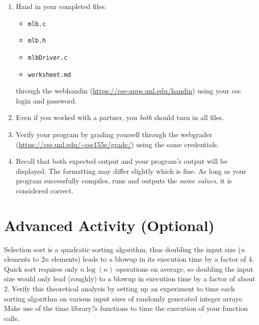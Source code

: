 \documentclass[12pt]{scrartcl}
\begin{document}
\begin{enumerate}
  \item Hand in your completed files:
  \begin{itemize}
    \item \texttt{mlb.c}
    \item \texttt{mlb.h}
    \item \texttt{mlbDriver.c}
    \item \texttt{worksheet.md}
  \end{itemize}
  through the webhandin (\url{https://cse-apps.unl.edu/handin})
  using your cse login and password.
  \item Even if you worked with a partner, you \emph{both} should
  turn in all files.
  \item Verify your program by grading yourself through the
  webgrader (\url{https://cse.unl.edu/~cse155e/grade/}) using the
  same credentials.
  \item Recall that both expected output and your program's output
  will be displayed.  The formatting may differ slightly which is fine.
  As long as your program successfully compiles, runs and outputs
  the \emph{same values}, it is considered correct.
\end{enumerate}

\section{Advanced Activity (Optional)}

Selection sort is a quadratic sorting algorithm, thus doubling the input size
($n$ elements to $2n$ elements) leads to a blowup in its execution time
by a factor of 4.  Quick sort requires only $n\log(n)$ operations on average,
so doubling the input size would only lead (roughly) to a blowup in execution
time by a factor of about 2.  Verify this theoretical analysis by setting up an
experiment to time each sorting algorithm on various input sizes of randomly
generated integer arrays.  Make use of the time library?s functions to time
the execution of your function calls.
\end{document}
